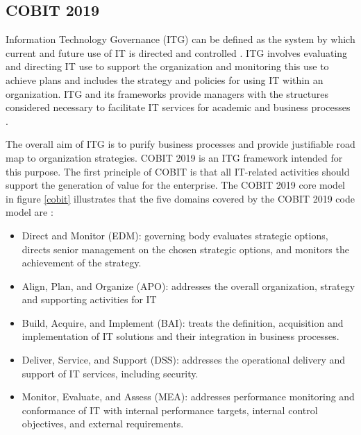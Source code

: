 \documentclass[preprint,3p,onecolumn]{elsarticle}
\begin{document}
\subsection{COBIT 2019}

\par Information Technology Governance (ITG) can be defined as the system by which current and future use of IT is directed and controlled \citep{calder2008iso}. ITG involves evaluating and directing IT use to support the organization and monitoring this use to achieve plans and includes the strategy and policies for using IT within an organization. ITG and its frameworks provide managers with the structures considered necessary to facilitate IT services for academic and business processes \citep{tawafak2020governance}.

\par The overall aim of ITG is to purify business processes and provide justifiable road map to organization strategies. COBIT 2019 \citep{information2018cobit} is an ITG framework intended for this purpose. The first principle of COBIT is that all IT-related activities should support the generation of value for the enterprise. The COBIT 2019 core model in figure \ref{cobit} illustrates that the five domains covered by the COBIT 2019 code model are \citep{cobitdesignguide2019}:

\begin{itemize}
\item Direct and Monitor (EDM): governing body evaluates strategic options, directs senior management on the chosen strategic options, and monitors the achievement of the strategy.
\item Align, Plan, and Organize (APO): addresses the overall organization, strategy and supporting activities for IT
\item Build, Acquire, and Implement (BAI): treats the definition, acquisition and implementation of IT solutions and their integration in business processes.
\item Deliver, Service, and Support (DSS): addresses the operational delivery and support of IT services, including security.
\item Monitor, Evaluate, and Assess (MEA): addresses performance monitoring and conformance of IT with internal performance targets, internal control objectives, and external requirements.
\end{itemize}
\end{document}
